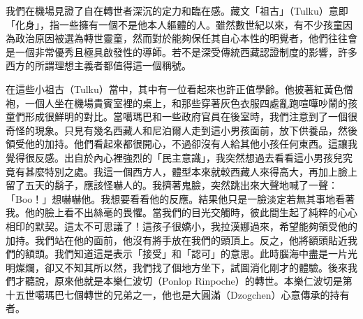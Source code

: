 我們在機場見證了自在轉世者深沉的定力和臨在感。藏文「祖古」（Tulku）意即「化身」，指一些擁有一個不是他本人軀體的人。雖然數世紀以來，有不少孩童因為政治原因被選為轉世靈童，然而對於能夠保任其自心本性的明覺者，他們往往會是一個非常優秀且極具啟發性的導師。若不是深受傳統西藏認證制度的影響，許多西方的所謂理想主義者都值得這一個稱號。

在這些小祖古（Tulku）當中，其中有一位看起來也許正值學齡。他披著紅黃色僧袍，一個人坐在機場貴賓室裡的桌上，和那些穿著灰色衣服四處亂跑喧嘩吵鬧的孩童們形成很鮮明的對比。當噶瑪巴和一些政府官員在後室時，我們注意到了一個很奇怪的現象。只見有幾名西藏人和尼泊爾人走到這小男孩面前，放下供養品，然後領受他的加持。他們看起來都很開心，不過卻沒有人給其他小孩任何東西。這讓我覺得很反感。出自於內心裡強烈的「民主意識」，我突然想過去看看這小男孩兒究竟有甚麼特別之處。我這一個西方人，體型本來就較西藏人來得高大，再加上臉上留了五天的鬍子，應該怪嚇人的。我擠著鬼臉，突然跳出來大聲地喊了一聲：「Boo！」想嚇嚇他。我想要看看他的反應。結果他只是一臉淡定若無其事地看著我。他的臉上看不出絲毫的畏懼。當我們的目光交觸時，彼此間生起了純粹的心心相印的默契。這太不可思議了！這孩子很嬌小，我拉漢娜過來，希望能夠領受他的加持。我們站在他的面前，他沒有將手放在我們的頭頂上。反之，他將額頭貼近我們的額頭。我們知道這是表示「接受」和「認可」的意思。此時腦海中盡是一片光明燦爛，卻又不知其所以然，我們找了個地方坐下，試圖消化剛才的體驗。後來我們才聽說，原來他就是本樂仁波切（Ponlop
Rinpoche）的轉世。本樂仁波切是第十五世噶瑪巴七個轉世的兄弟之一，他也是大圓滿（Dzogchen）心意傳承的持有者。

